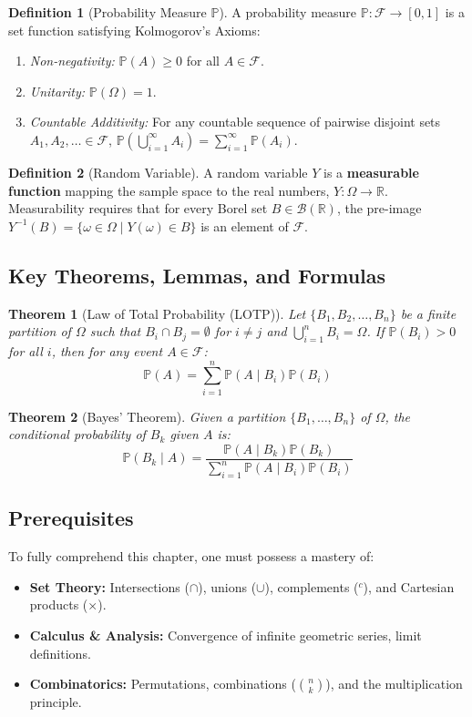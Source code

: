 \documentclass[11pt]{article}
\theoremstyle{definition}
\newtheorem{definition}{Definition}[section]
\theoremstyle{plain}
\newtheorem{theorem}{Theorem}[section]
\theoremstyle{remark}
\newcommand{\R}{\mathbb{R}}
\newcommand{\F}{\mathcal{F}}
\newcommand{\B}{\mathcal{B}}
\renewcommand{\P}{\mathbb{P}}
\newcommand{\1}{\mathbf{1}}
\begin{document}
\begin{definition}[Probability Measure $\P$]
A probability measure $\P: \F \to [0, 1]$ is a set function satisfying Kolmogorov's Axioms:
\begin{enumerate}
    \item \textit{Non-negativity:} $\P(A) \ge 0$ for all $A \in \F$.
    \item \textit{Unitarity:} $\P(\Omega) = 1$.
    \item \textit{Countable Additivity:} For any countable sequence of pairwise disjoint sets $A_1, A_2, \dots \in \F$, $\P\left(\bigcup_{i=1}^\infty A_i\right) = \sum_{i=1}^\infty \P(A_i)$.
\end{enumerate}
\end{definition}

\begin{definition}[Random Variable]
A random variable $Y$ is a \textbf{measurable function} mapping the sample space to the real numbers, $Y: \Omega \to \R$. Measurability requires that for every Borel set $B \in \B(\R)$, the pre-image $Y^{-1}(B) = \{\omega \in \Omega \mid Y(\omega) \in B\}$ is an element of $\F$.
\end{definition}

\subsection{Key Theorems, Lemmas, and Formulas}
\begin{theorem}[Law of Total Probability (LOTP)]
Let $\{B_1, B_2, \dots, B_n\}$ be a finite partition of $\Omega$ such that $B_i \cap B_j = \emptyset$ for $i \neq j$ and $\bigcup_{i=1}^n B_i = \Omega$. If $\P(B_i) > 0$ for all $i$, then for any event $A \in \F$:
\[ \P(A) = \sum_{i=1}^n \P(A \mid B_i) \P(B_i) \]
\end{theorem}

\begin{theorem}[Bayes' Theorem]
Given a partition $\{B_1, \dots, B_n\}$ of $\Omega$, the conditional probability of $B_k$ given $A$ is:
\[ \P(B_k \mid A) = \frac{\P(A \mid B_k) \P(B_k)}{\sum_{i=1}^n \P(A \mid B_i) \P(B_i)} \]
\end{theorem}

\subsection{Prerequisites}
To fully comprehend this chapter, one must possess a mastery of:
\begin{itemize}
    \item \textbf{Set Theory:} Intersections ($\cap$), unions ($\cup$), complements ($^c$), and Cartesian products ($\times$).
    \item \textbf{Calculus \& Analysis:} Convergence of infinite geometric series, limit definitions.
    \item \textbf{Combinatorics:} Permutations, combinations ($\binom{n}{k}$), and the multiplication principle.
\end{itemize}
\end{document}
